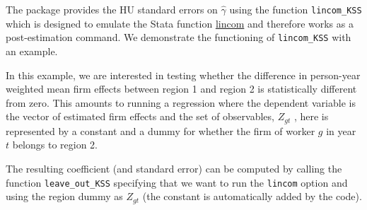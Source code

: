 \documentclass[11pt]{article}
\begin{document}
The package provides the HU standard errors on \(\hat{\gamma}\)
using the function \texttt{lincom\_KSS} which is designed to emulate the Stata
function \href{https://www.stata.com/manuals13/rlincom.pdf}{lincom} and therefore works as a post-estimation
command. We demonstrate the functioning of \texttt{lincom\_KSS} with an
example.

In this example, we are interested in testing whether the difference in
person-year weighted mean firm effects between region 1 and region 2 is
statistically different from zero. This amounts to running a regression
where the dependent variable is the vector of estimated firm effects and
the set of observables, \(Z_{gt}\) , here is represented by a constant
and a dummy for whether the firm of worker \(g\) in year \(t\) belongs
to region 2.

The resulting coefficient (and standard error) can be computed by
calling the function \texttt{leave\_out\_KSS} specifying that we want to
run the \texttt{lincom} option and using the region dummy as \(Z_{gt}\)
(the constant is automatically added by the code).
\end{document}

